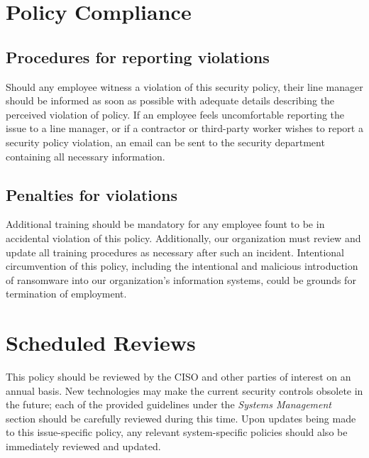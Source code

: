 \documentclass[11pt]{article}
\begin{document}
\section{Policy Compliance}
\label{sec:org6f3f442}
\subsection{Procedures for reporting violations}
\label{sec:org7d3fad7}
Should any employee witness a violation of this security policy, their line manager should be informed as soon as possible with adequate details describing the perceived violation of policy. If an employee feels uncomfortable reporting the issue to a line manager, or if a contractor or third-party worker wishes to report a security policy violation, an email can be sent to the security department containing all necessary information.

\subsection{Penalties for violations}
\label{sec:org7bf5700}
Additional training should be mandatory for any employee fount to be in accidental violation of this policy. Additionally, our organization must review and update all training procedures as necessary after such an incident. Intentional circumvention of this policy, including the intentional and malicious introduction of ransomware into our organization's information systems, could be grounds for termination of employment.

\section{Scheduled Reviews}
\label{sec:org729cf16}
This policy should be reviewed by the CISO and other parties of interest on an annual basis. New technologies may make the current security controls obsolete in the future; each of the provided guidelines under the \emph{Systems Management} section should be carefully reviewed during this time. Upon updates being made to this issue-specific policy, any relevant system-specific policies should also be immediately reviewed and updated.
\end{document}
